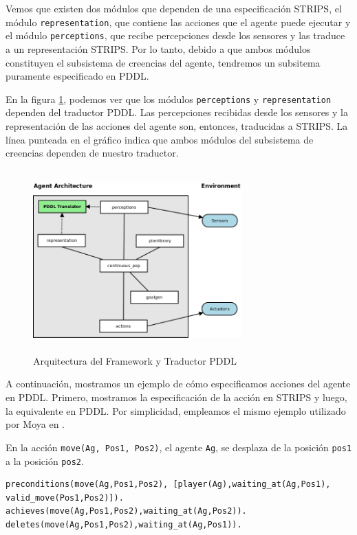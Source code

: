 Vemos que existen dos m\'odulos que dependen de una especificaci\'on STRIPS,
el m\'odulo \texttt{representation}, que contiene las acciones que el agente
puede ejecutar y el m\'odulo \texttt{perceptions}, que recibe percepciones
desde los sensores y las traduce a un representaci\'on STRIPS. Por lo
tanto, debido a que ambos m\'odulos constituyen el subsistema de
creencias del agente, tendremos un subsitema puramente especificado en PDDL.

En la figura \ref{framework:moduleswithPDDL}, podemos ver que 
los m\'odulos \texttt{perceptions} y \texttt{representation} 
dependen del traductor PDDL. Las percepciones
recibidas desde los sensores y la representaci\'on de las acciones del agente
son, entonces, traducidas a STRIPS. La l\'inea punteada en el gr\'afico
indica que ambos m\'odulos del subsistema de creencias dependen
de nuestro traductor.


	\begin{figure}[h!]
	\centering
		\includegraphics[width=8cm,height=7cm]{arqframework.png}
		\caption{Arquitectura del Framework y Traductor PDDL}
		\label{framework:moduleswithPDDL}
	\end{figure}


A continuaci\'on, mostramos un ejemplo de c\'omo especificamos
acciones del agente en PDDL. Primero, mostramos
la especificaci\'on de la acci\'on en STRIPS y luego,
la equivalente en PDDL. Por simplicidad, empleamos el mismo ejemplo utilizado
por Moya en \cite{gbraun:tesisMarioMoya}. 

\begin{ejemplo}%

En la acci\'on \texttt{move(Ag, Pos1, Pos2)}, el agente 
\texttt{Ag}, se desplaza de la posici\'on \texttt{pos1}
a la posici\'on \texttt{pos2}. 

 \begin{verbatim}
preconditions(move(Ag,Pos1,Pos2), [player(Ag),waiting_at(Ag,Pos1),
valid_move(Pos1,Pos2)]).
achieves(move(Ag,Pos1,Pos2),waiting_at(Ag,Pos2)).
deletes(move(Ag,Pos1,Pos2),waiting_at(Ag,Pos1)).
 \end{verbatim}
\end{ejemplo}

